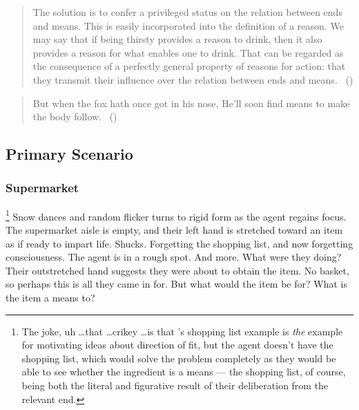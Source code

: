 \documentclass[10pt]{article}
\newcommand{\hozline}[0]{%
  \noindent\hdashrule[0.5ex][c]{\textwidth}{.1pt}{}
}
\begin{document}
\begin{quote}
  The solution is to confer a privileged status on the relation between ends and means.
  This is easily incorporated into the definition of a reason.
  We may say that if being thirsty provides a reason to drink, then it also provides a reason for what enables one to drink. That can be regarded as the consequence of a perfectly general property of reasons for action: that they transmit their influence over the relation between ends and means.\nolinebreak
  \mbox{ }\hfill(\cite[34]{Nagel:1970aa})
\end{quote}

\begin{quote}
  But when the fox hath once got in his nose, He’ll soon find means to make the body follow.\newline
  \mbox{ }\hfill\mbox{()}
\end{quote}

\newpage

\subsection*{Primary Scenario}
\label{sec:scenario}

\hozline

\subsubsection*{Supermarket}

\begin{scenario}\label{scenario:shopping}\footnote{The joke, uh \dots that \dots crikey \dots is that \citeauthor{Anscombe:1957aa}'s shopping list example is \emph{the} example for motivating ideas about direction of fit, but the agent doesn't have the shopping list, which would solve the problem completely as they would be able to see whether the ingredient is a means --- the shopping list, of course, being both the literal and figurative result of their deliberation from the relevant end.}
  Snow dances and random flicker turns to rigid form as the agent regains focus.
  The supermarket aisle is empty, and their left hand is stretched toward an item as if ready to impart life.
  Shucks.
  Forgetting the shopping list, and now forgetting consciousness.
  The agent is in a rough spot.
  And more.
  What were they doing?
  Their outstretched hand suggests they were about to obtain the item.
  No basket, so perhaps this is all they came in for.
  But what would the item be for?
  What is the item a means to?
\end{scenario}
\end{document}
